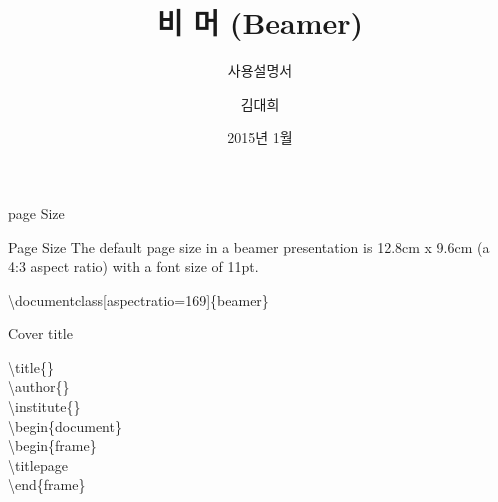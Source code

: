 \documentclass[10pt,blue,xcolor=pdftex,dvipsnames,table,handout]{beamer}
\begin{document}
	

			\title{비 머 (Beamer)}
			\subtitle{사용설명서}
			\author{김대희}
			\date[2011.11.10]{2015년 1월}



		\begin{frame}[plain]
		\titlepage
		\end{frame}


		\begin{frame}{page Size}

			\begin{block} {Page Size}
			The default page size 
			in a beamer presentation is 12.8cm x 9.6cm (a 4:3 aspect ratio) 
			with a font size of 11pt.
			\end{block}


%		

			\textbackslash documentclass[aspectratio=169]\{beamer\}

		\end{frame}



		\begin{frame}{Cover title}

			\textbackslash title\{\} \\
			\textbackslash author\{\} \\
			\textbackslash institute\{\} \\ 

			\textbackslash begin\{document\} \\
			\textbackslash begin\{frame\} \\
			\textbackslash titlepage  \\
			\textbackslash end\{frame\}  \\

		\end{frame}
\end{document}
